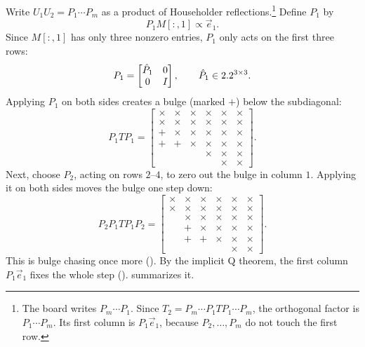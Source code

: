 Write $U_1U_2 = P_1\cdots P_m$ as a product of Householder reflections.\footnote{The board writes $P_m\cdots P_1$. Since $T_2 = P_m\cdots P_1TP_1\cdots P_m$, the orthogonal factor is $P_1\cdots P_m$. Its first column is $P_1\vec{e}_1$, because $P_2, \dots, P_m$ do not touch the first row.} Define $P_1$ by
\begin{equation}
  P_1M[:, 1] \propto \vec{e}_1.
\end{equation}
Since $M[:, 1]$ has only three nonzero entries, $P_1$ only acts on the first three rows:
\begin{equation}
  P_1 = \begin{bmatrix} \hat{P}_1 & 0 \\ 0 & I \end{bmatrix},
  \qquad \hat{P}_1 \in 2.2^{3 \times 3}.
\end{equation}
Applying $P_1$ on both sides creates a bulge (marked $+$) below the subdiagonal:
\begin{equation}
  P_1TP_1 = \begin{bmatrix}
    \times & \times & \times & \times & \times & \times \\
    \times & \times & \times & \times & \times & \times \\
    + & \times & \times & \times & \times & \times \\
    + & + & \times & \times & \times & \times \\
      &   &   & \times & \times & \times \\
      &   &   &   & \times & \times
  \end{bmatrix}.
\end{equation}
Next, choose $P_2$, acting on rows $2$--$4$, to zero out the bulge in column $1$. Applying it on both sides moves the bulge one step down:
\begin{equation}
  P_2P_1TP_1P_2 = \begin{bmatrix}
    \times & \times & \times & \times & \times & \times \\
    \times & \times & \times & \times & \times & \times \\
      & \times & \times & \times & \times & \times \\
      & + & \times & \times & \times & \times \\
      & + & + & \times & \times & \times \\
      &   &   &   & \times & \times
  \end{bmatrix}.
\end{equation}
This is bulge chasing once more (). By the implicit Q theorem, the first column $P_1\vec{e}_1$ fixes the whole step ().  summarizes it.

